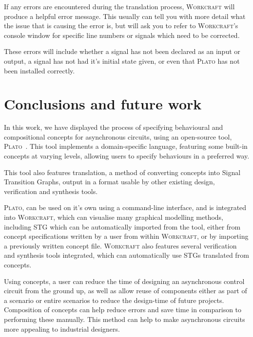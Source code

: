 \documentclass[british,conference,compsoc]{IEEEtran}
\newcommand{\noun}[1]{\textsc{#1}}
\begin{document}
If any errors are encountered during the translation process, \noun{Workcraft} 
will produce a helpful error message. This usually can tell you with more 
detail what the issue that is causing the error is, but will ask you to refer 
to \noun{Workcraft}'s console window for specific line numbers or signals which
need to be corrected. 

These errors will include whether a signal has not been declared as an input or
output, a signal has not had it's initial state given, or even that \noun{Plato}
has not been installed correctly. 

\vspace{-3mm}

\vspace{-2mm}

\section{Conclusions and future work\label{sec:conclusions}}

\vspace{-3mm}

In this work, we have displayed the process of specifying behavioural and 
compositional concepts for asynchronous circuits, using an open-source
tool, \noun{Plato}~\cite{2016_concepts_github}. This tool implements a domain-specific 
language, featuring some built-in concepts at varying levels, allowing users to
specify behaviours in a preferred way. 

This tool also features translation, a method of converting concepts into Signal
Transition Graphs, output in a format usable by other existing design, 
verification and synthesis tools. 

\noun{Plato}, can be used on it's own using a command-line interface, and is
integrated into \noun{Workcraft}, which can visualise many graphical modelling
methods, including STG which can be automatically imported from the
tool, either from concept specifications written by a user from within 
\noun{Workcraft}, or by importing a previously written concept file.
\noun{Workcraft} also features several verification and synthesis tools 
integrated, which can automatically use STGs translated from concepts. 

Using concepts, a user can reduce the time of designing an asynchronous
control circuit from the ground up, as well as allow reuse of components
either as part of a scenario or entire scenarios to reduce the design-time
of future projects. Composition of concepts can help
reduce errors and save time in comparison to performing these manually.
This method can help to make asynchronous circuits more appealing
to industrial designers.
\end{document}
